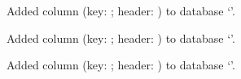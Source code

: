 \documentclass[12pt]{article}
\begin{document}
Added column  
(key: ; header: )
to database `'. 

Added column  
(key: ; header: )
to database `'. 

Added column  
(key: ; header: )
to database `'. 
\end{document}

